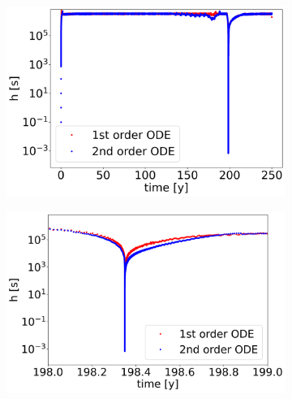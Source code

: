 \begin{figure}[H]
    \centering
    \begin{subfigure}{0.32\textwidth}
    	\centering
    	\includegraphics[width=1\textwidth]{images/TANDEMcompareFormulationstimeEvolutionDTall.png}
    \end{subfigure}
    \begin{subfigure}{0.32\textwidth}
    	\centering
    	\includegraphics[width=1\textwidth]{images/TANDEMcompareFormulationstimeEvolutionDTsurroundings.png}
    \end{subfigure}
    \begin{subfigure}{0.32\textwidth}
    	\centering

\end{subfigure}
\end{figure}
